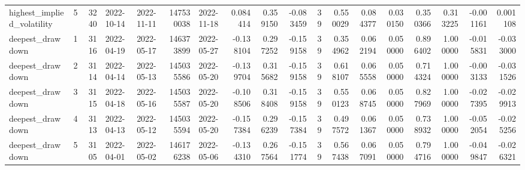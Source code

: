 \begin{tabular}{lrrllrlrrrrrrrrrrr}
highest\_implied\_volatility & 5 & 3240 & 2022-10-14 & 2022-11-11 & 147530038 & 2022-11-18 & 0.084414 & 0.359150 & -0.083459 & 39 & 0.550029 & 0.084377 & 0.030150 & 0.350366 & 0.313225 & -0.001161 & 0.001108 \\
deepest\_drawdown & 1 & 3116 & 2022-04-19 & 2022-05-17 & 146373899 & 2022-05-27 & -0.138104 & 0.297252 & -0.159158 & 39 & 0.354962 & 0.062194 & 0.050000 & 0.896402 & 1.000000 & -0.015831 & -0.033000 \\
deepest\_drawdown & 2 & 3114 & 2022-04-14 & 2022-05-13 & 145035586 & 2022-05-20 & -0.139704 & 0.315682 & -0.159158 & 39 & 0.618107 & 0.065558 & 0.050000 & 0.714324 & 1.000000 & -0.003133 & -0.031526 \\
deepest\_drawdown & 3 & 3115 & 2022-04-18 & 2022-05-16 & 145035587 & 2022-05-20 & -0.108506 & 0.318408 & -0.159158 & 39 & 0.550123 & 0.068745 & 0.050000 & 0.827969 & 1.000000 & -0.027395 & -0.029913 \\
deepest\_drawdown & 4 & 3113 & 2022-04-13 & 2022-05-12 & 145035594 & 2022-05-20 & -0.157384 & 0.296239 & -0.157384 & 39 & 0.497572 & 0.061367 & 0.050000 & 0.738932 & 1.000000 & -0.052054 & -0.025256 \\
deepest\_drawdown & 5 & 3105 & 2022-04-01 & 2022-05-02 & 146176238 & 2022-05-06 & -0.134310 & 0.267564 & -0.151774 & 39 & 0.567438 & 0.067091 & 0.050000 & 0.794716 & 1.000000 & -0.049847 & -0.026321 \\
\bottomrule
\end{tabular}

